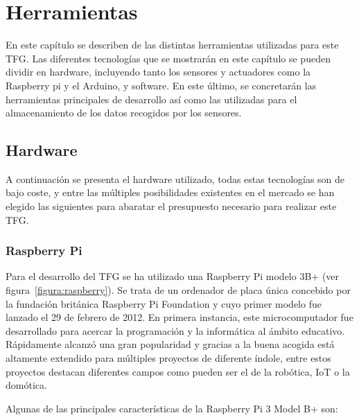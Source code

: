 \documentclass[a4paper, 12pt, oneside]{book}
\begin{document}

\cleardoublepage %
\chapter{Herramientas} 
\label{chap:herramientas}

En este capítulo se  describen de las distintas herramientas utilizadas para este TFG. Las diferentes tecnologías que se mostrarán en este capítulo se pueden dividir en hardware, incluyendo tanto los sensores y actuadores como la Raspberry pi y el Arduino, y software. En este último, se concretarán las herramientas principales de desarrollo así como las utilizadas para el almacenamiento de los datos recogidos por los sensores.


\section{Hardware}
\label{sec:hardware}

A continuación se presenta el hardware utilizado, todas estas tecnologías son de bajo coste, y entre las múltiples posibilidades existentes en el mercado se han elegido las siguientes para abaratar el presupuesto necesario para realizar este TFG.

\subsection{Raspberry Pi}
\label{subsec:raspberry pi}

Para el desarrollo del TFG se ha utilizado una Raspberry Pi modelo 3B+ (ver figura~\ref{figura:raspberry}). Se trata de un ordenador de placa única concebido por la fundación británica Raspberry Pi Foundation y cuyo primer modelo fue lanzado el 29 de febrero de 2012. En primera instancia, este microcomputador fue desarrollado para acercar la programación y la informática al ámbito educativo. Rápidamente alcanzó una gran popularidad y gracias a la buena acogida está altamente extendido para múltiples proyectos de diferente índole, entre estos proyectos destacan diferentes campos como pueden ser el de la robótica, IoT o la domótica.

Algunas de las principales características de la Raspberry Pi 3 Model B+ son:
\end{document}
